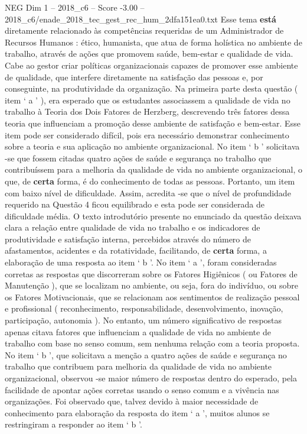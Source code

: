\begin{textsample}{NEG Dim 1 – 2018\_c6 – Score -3.00 – 2018\_c6/enade\_2018\_tec\_gest\_rec\_hum\_2dfa151ea0.txt}
Esse tema \textbf{está} diretamente relacionado às competências requeridas de um Administrador de Recursos Humanos : ético, humanista, que atua de forma holística no ambiente de trabalho, através de ações que promovem saúde, bem-estar e qualidade de vida.
Cabe ao gestor criar políticas organizacionais capazes de promover esse ambiente de qualidade, que interfere diretamente na satisfação das pessoas e, por conseguinte, na produtividade da organização.
Na primeira parte desta questão ( item ‘ a ’ ), era esperado que os estudantes associassem a qualidade de vida no trabalho à Teoria dos Dois Fatores de Herzberg, descrevendo três fatores dessa teoria que influenciam a promoção desse ambiente de satisfação e bem-estar.
Esse item pode ser considerado difícil, pois era necessário demonstrar conhecimento sobre a teoria e sua aplicação no ambiente organizacional.
No item ‘ b ’ solicitava -se que fossem citadas quatro ações de saúde e segurança no trabalho que contribuíssem para a melhoria da qualidade de vida no ambiente organizacional, o que, de \textbf{certa} forma, é do conhecimento de todas as pessoas.
Portanto, um item com baixo nível de dificuldade.
Assim, acredita -se que o nível de profundidade requerido na Questão 4 ficou equilibrado e esta pode ser considerada de dificuldade média.
O texto introdutório presente no enunciado da questão deixava clara a relação entre qualidade de vida no trabalho e os indicadores de produtividade e satisfação interna, percebidos através do número de afastamentos, acidentes e da rotatividade, facilitando, de \textbf{certa} forma, a elaboração de uma resposta ao item ‘ b ’.
No item ‘ a ’, foram consideradas corretas as respostas que discorreram sobre os Fatores Higiênicos ( ou Fatores de Manutenção ), que se localizam no ambiente, ou seja, fora do indivíduo, ou sobre os Fatores Motivacionais, que se relacionam aos sentimentos de realização pessoal e profissional ( reconhecimento, responsabilidade, desenvolvimento, inovação, participação, autonomia ).
No entanto, um número significativo de respostas apenas citava fatores que influenciam a qualidade de vida no ambiente de trabalho com base no senso comum, sem nenhuma relação com a teoria proposta.
No item ‘ b ’, que solicitava a menção a quatro ações de saúde e segurança no trabalho que contribuem para melhoria da qualidade de vida no ambiente organizacional, observou -se maior número de respostas dentro do esperado, pela facilidade de apontar ações corretas usando o senso comum e a vivência nas organizações.
Foi observado que, talvez devido à maior necessidade de conhecimento para elaboração da resposta do item ‘ a ’, muitos alunos se restringiram a responder ao item ‘ b ’.

\end{textsample}

